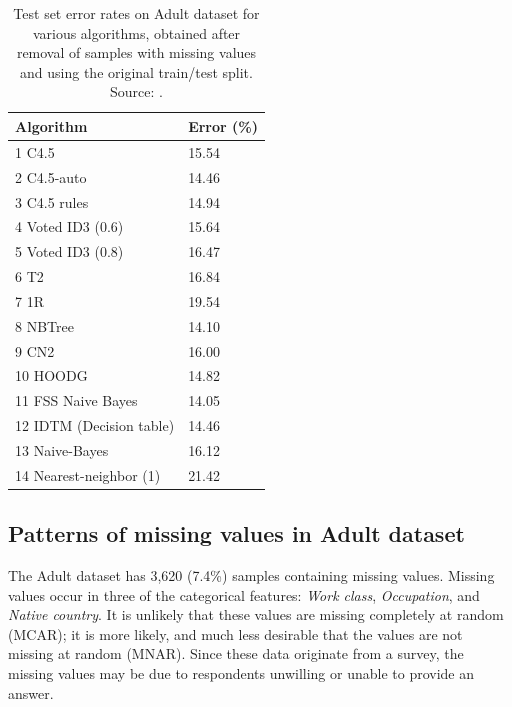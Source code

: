\documentclass[10pt,twocolumn,letterpaper]{article}
\begin{document}
\begin{table}[htb]
\centering
\begin{tabular}{@{}ll@{}}
\toprule
\textbf{Algorithm}       & \textbf{Error (\%)} \\ \midrule
1  C4.5                  & 15.54          \\
2  C4.5-auto             & 14.46          \\
3  C4.5 rules            & 14.94          \\
4  Voted ID3 (0.6)       & 15.64          \\
5  Voted ID3 (0.8)       & 16.47          \\
6  T2                    & 16.84          \\
7  1R                    & 19.54          \\
8  NBTree                & 14.10          \\
9  CN2                   & 16.00          \\
10 HOODG                 & 14.82          \\
11 FSS Naive Bayes       & 14.05          \\
12 IDTM (Decision table) & 14.46          \\
13 Naive-Bayes           & 16.12          \\
14 Nearest-neighbor (1)  & 21.42          \\ \bottomrule
\end{tabular}
\caption{Test set error rates on Adult dataset for various algorithms, obtained after removal of samples with missing values and using the original train/test split. Source: \cite{Lichman2013}.}
\label{tab:benchmarks}
\end{table}

\subsection{Patterns of missing values in Adult dataset}

The Adult dataset has 3,620 (7.4\%) samples containing missing values. Missing values occur in three of the categorical features: \textit{Work class}, \textit{Occupation}, and \textit{Native country}. It is unlikely that these values are missing completely at random (MCAR); it is more likely, and much less desirable that the values are not missing at random (MNAR). Since these data originate from a survey, the missing values may be due to respondents unwilling or unable to provide an answer.  \\
\end{document}
